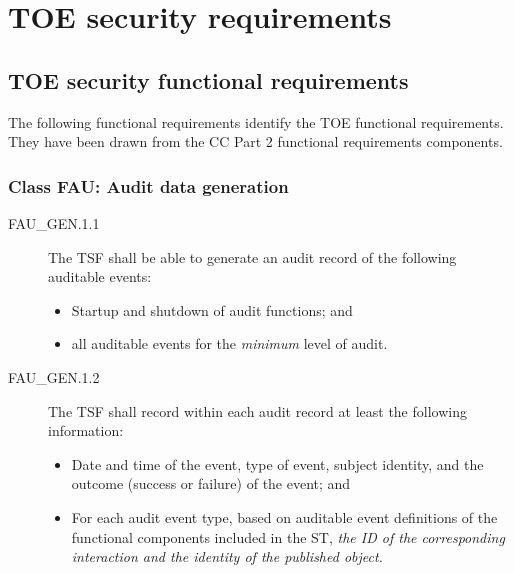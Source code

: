 \documentclass[12pt,english]{scrbook}
\begin{document}



\section{TOE security requirements}





\subsection{TOE security functional requirements}

The following functional requirements identify the TOE functional requirements.
They have been drawn from the CC Part 2 functional requirements components.





\subsubsection{Class FAU: Audit data generation}





\begin{description}
  
  \item[FAU\_GEN.1.1] The TSF shall be able to generate an audit record of the
  following auditable events:
  \begin{itemize}
      \item Startup and shutdown of audit functions; and
      \item all auditable events for the \emph{minimum} level of audit.
  \end{itemize}

\item[FAU{\_}GEN.1.2]

The TSF shall record within each audit record at least the
following information:

\begin{itemize}
\item 
Date and time of the event, type of event, subject identity,
and the outcome (success or failure) of the event; and

\item For each audit event type, based on auditable event definitions
of the functional components included in the ST, \emph{the ID of the
corresponding interaction and the identity of the published object.}
\end{itemize}

\end{description}
\end{document}
